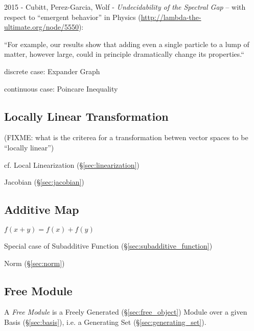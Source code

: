 2015 - Cubitt, Perez-Garcia, Wolf - \emph{Undecidability of the Spectral Gap} --
with respect to ``emergent behavior'' in Physics
(\url{http://lambda-the-ultimate.org/node/5550}):

``For example, our results show that adding even a single particle to a lump of
matter, however large, could in principle dramatically change its properties.``

discrete case: Expander Graph

continuous case: Poincare Inequality



\subsection{Locally Linear Transformation}\label{sec:locally_linear}


(FIXME: what is the criterea for a transformation betwen vector spaces to be
``locally linear'')

\fist cf. Local Linearization (\S\ref{sec:linearization})

\fist Jacobian (\S\ref{sec:jacobian})



\subsection{Additive Map}\label{sec:additive_map}

$f(x + y) = f(x) + f(y)$

Special case of Subadditive Function (\S\ref{sec:subadditive_function})

Norm (\S\ref{sec:norm})



\subsection{Free Module}\label{sec:free_module}

A \emph{Free Module} is a Freely Generated (\S\ref{sec:free_object}) Module
over a given Basis (\S\ref{sec:basis}), i.e. a Generating Set
(\S\ref{sec:generating_set}).

